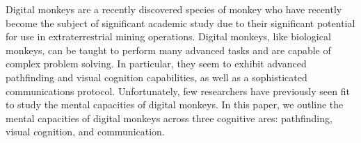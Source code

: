 Digital monkeys are a recently discovered species of monkey who have recently become the
subject of significant academic study due to their significant potential for use in
extraterrestrial mining operations.
Digital monkeys, like biological monkeys, can be taught to perform many advanced tasks and are
capable of complex problem solving.
In particular, they seem to exhibit advanced pathfinding and visual cognition capabilities, as well
as a sophisticated communications protocol.
Unfortunately, few researchers have previously seen fit to study the mental capacities of digital
monkeys.
In this paper, we outline the mental capacities of digital monkeys across three cognitive ares:
pathfinding, visual cognition, and communication.